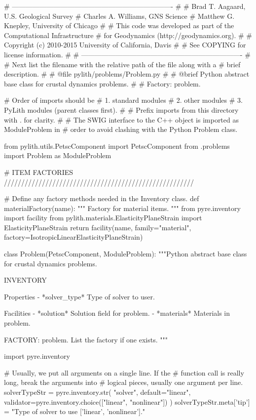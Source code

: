 \begin{python}
# ----------------------------------------------------------------------
#
# Brad T. Aagaard, U.S. Geological Survey
# Charles A. Williams, GNS Science
# Matthew G. Knepley, University of Chicago
#
# This code was developed as part of the Computational Infrastructure
# for Geodynamics (http://geodynamics.org).
#
# Copyright (c) 2010-2015 University of California, Davis
#
# See COPYING for license information.
#
# ----------------------------------------------------------------------
# 
# Next list the filename with the relative path of the file along with a
# brief description.
#  
# @file pylith/problems/Problem.py
#
# @brief Python abstract base class for crustal dynamics problems.
#
# Factory: problem.

# Order of imports should be
# 1. standard modules
# 2. other modules
# 3. PyLith modules (parent classes first).
#
# Prefix imports from this directory with . for clarity.
#  
# The SWIG interface to the C++ object is imported as ModuleProblem in
# order to avoid clashing with the Python Problem class.

from pylith.utils.PetscComponent import PetscComponent
from .problems import Problem as ModuleProblem

# ITEM FACTORIES ///////////////////////////////////////////////////////

# Define any factory methods needed in the Inventory class.
def materialFactory(name):
    """
    Factory for material items.
    """
    from pyre.inventory import facility
    from pylith.materials.ElasticityPlaneStrain import ElasticityPlaneStrain
    return facility(name, family="material", factory=IsotropicLinearElasticityPlaneStrain)

class Problem(PetscComponent, ModuleProblem):
    """Python abstract base class for crustal dynamics problems.

    INVENTORY

    Properties
      - *solver_type* Type of solver to user.

    Facilities
      - *solution* Solution field for problem.
      - *materials* Materials in problem.
      
    FACTORY: problem. List the factory if one exists.
    """

    import pyre.inventory

    # Usually, we put all arguments on a single line. If the
    # function call is really long, break the arguments into
    # logical pieces, usually one argument per line.
    solverTypeStr = pyre.inventory.str(
        "solver",
        default="linear",
        validator=pyre.inventory.choice(["linear", "nonlinear"])
    )
    solverTypeStr.meta['tip'] = "Type of solver to use ['linear', 'nonlinear']."


\end{python}
